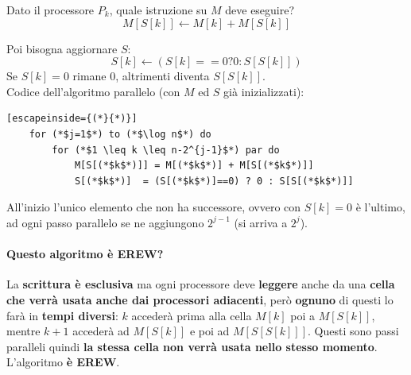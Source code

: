\documentclass[11pt]{article}
\begin{document}
	Dato il processore $P_k$, quale istruzione su $M$ deve eseguire? 
	$$ M[S[k]] \leftarrow M[k] + M[S[k]] $$
	
	Poi bisogna aggiornare $S$:
	$$ S[k] \leftarrow \left(S[k] == 0? 0 : S[S[k]] \right) $$
	Se $S[k] = 0$ rimane $0$, altrimenti diventa $S[S[k]]$.\\
	
	Codice dell'algoritmo parallelo (con $M$ ed $S$ già inizializzati):
	\begin{lstlisting}[escapeinside={(*}{*)}]
	for (*$j=1$*) to (*$\log n$*) do 
		for (*$1 \leq k \leq n-2^{j-1}$*) par do
			M[S[(*$k$*)]] = M[(*$k$*)] + M[S[(*$k$*)]]
			S[(*$k$*)]  = (S[(*$k$*)]==0) ? 0 : S[S[(*$k$*)]]
	\end{lstlisting}
	
	All'inizio l'unico elemento che non ha successore, ovvero con $S[k] = 0$ è l'ultimo, ad ogni passo parallelo se ne aggiungono $2^{j-1}$ (si arriva a $2^j$).\\
	
	\newpage
	
	\paragraph{Questo algoritmo è EREW?} La \textbf{scrittura è esclusiva} ma ogni processore deve \textbf{leggere} anche da una \textbf{cella che verrà usata anche dai processori adiacenti}, però \textbf{ognuno} di questi lo farà in \textbf{tempi diversi}: $k$ accederà prima alla cella $M[k]$ poi a $M[S[k]]$, mentre $k+1$ accederà ad $M[S[k]]$ e poi ad $M[S[S[k]]]$. Questi sono passi paralleli quindi \textbf{la stessa cella non verrà usata nello stesso momento}.\\
	L'algoritmo \textbf{è EREW}.\\
	
	
\end{document}
